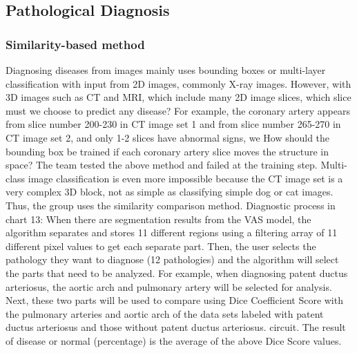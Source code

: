 \documentclass{article}
\begin{document}
\begin{multicols}{2}
\subsection{Pathological Diagnosis}
\subsubsection{Similarity-based method} 

Diagnosing diseases from images mainly uses bounding boxes or multi-layer classification with input from 2D images, commonly X-ray images. However, with 3D images such as CT and MRI, which include many 2D image slices, which slice must we choose to predict any disease? For example, the coronary artery appears from slice number 200-230 in CT image set 1 and from slice number 265-270 in CT image set 2, and only 1-2 slices have abnormal signs, we How should the bounding box be trained if each coronary artery slice moves the structure in space? The team tested the above method and failed at the training step. Multi-class image classification is even more impossible because the CT image set is a very complex 3D block, not as simple as classifying simple dog or cat images. Thus, the group uses the similarity comparison method. Diagnostic process in chart 13: When there are segmentation results from the VAS model, the algorithm separates and stores 11 different regions using a filtering array of 11 different pixel values to get each separate part. Then, the user selects the pathology they want to diagnose (12 pathologies) and the algorithm will select the parts that need to be analyzed. For example, when diagnosing patent ductus arteriosus, the aortic arch and pulmonary artery will be selected for analysis. Next, these two parts will be used to compare using Dice Coefficient Score with the pulmonary arteries and aortic arch of the data sets labeled with patent ductus arteriosus and those without patent ductus arteriosus. circuit. The result of disease or normal (percentage) is the average of the above Dice Score values.





\end{multicols}
\end{document}
